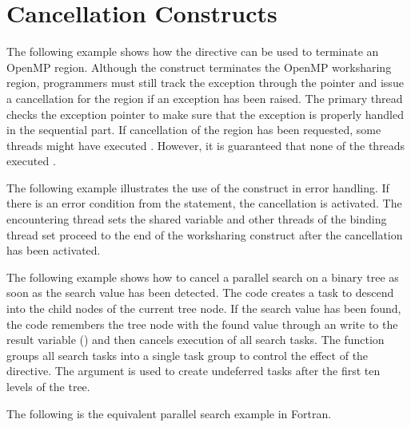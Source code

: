 \section{Cancellation Constructs}
\label{sec:cancellation}

The following example shows how the  directive can be used to terminate 
an OpenMP region. Although the  construct terminates the OpenMP 
worksharing region, programmers must still track the exception through the pointer 
 and issue a cancellation for the  region if an exception has
been raised. The primary thread checks the exception pointer to make sure that the 
exception is properly handled in the sequential part. If cancellation of the  
region has been requested, some threads might have executed . 
However, it is guaranteed that none of the threads executed .



The following example illustrates the use of the  construct in error 
handling. If there is an error condition from the  statement, 
the cancellation is activated. The encountering thread sets the shared variable 
 and other threads of the binding thread set proceed to the end of 
the worksharing construct after the cancellation has been activated. 


The following example shows how to cancel a parallel search on a binary tree as 
soon as the search value has been detected. The code creates a task to descend 
into the child nodes of the current tree node. If the search value has been found, 
the code remembers the tree node with the found value through an  
write to the result variable () and then cancels execution of all search tasks. The
function  groups all search tasks into a single 
task group to control the effect of the  directive. The 
 argument is used to create undeferred tasks after the first ten 
levels of the tree.



The following is the equivalent parallel search example in Fortran.



